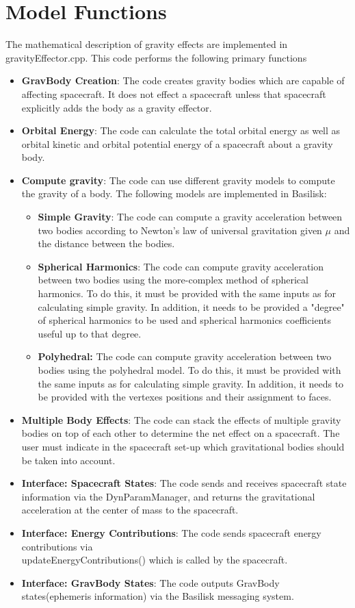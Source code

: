 \section{Model Functions}
The mathematical description of gravity effects are implemented in gravityEffector.cpp. This code performs the following primary functions
\begin{itemize}
	\item \textbf{GravBody Creation}: The code creates gravity bodies which are capable of affecting spacecraft. It does not effect a spacecraft unless that spacecraft explicitly adds the body as a gravity effector.
	\item \textbf{Orbital Energy}: The code can calculate the total orbital energy as well as orbital kinetic and orbital potential energy of a spacecraft about a gravity body.
	\item \textbf{Compute gravity}: The code can use different gravity models to compute the gravity of a body. The following models are implemented in Basilisk:
	\begin{itemize}
		\item \textbf{Simple Gravity}: The code can compute a gravity acceleration between two bodies according to Newton's law of universal gravitation given $\mu$ and the distance between the bodies.
		\item \textbf{Spherical Harmonics}: The code can compute gravity acceleration between two bodies using the more-complex method of spherical harmonics. To do this, it must be provided with the same inputs as for calculating simple gravity. In addition, it needs to be provided a "degree" of spherical harmonics to be used and spherical harmonics coefficients useful up to that degree.
		\item \textbf{Polyhedral:} The code can compute gravity acceleration between two bodies using the polyhedral model. To do this, it must be provided with the same inputs as for calculating simple gravity. In addition, it needs to be provided with the vertexes positions and their assignment to faces.
	\end{itemize}
	\item \textbf{Multiple Body Effects}: The code can stack the effects of multiple gravity bodies on top of each other to determine the net effect on a spacecraft. The user must indicate in the spacecraft set-up which gravitational bodies should be taken into account.
	\item \textbf{Interface: Spacecraft States}: The code sends and receives spacecraft state information via the DynParamManager, and returns the gravitational acceleration at the center of mass to the spacecraft.
	\item \textbf{Interface: Energy Contributions}: The code sends spacecraft energy contributions via \\updateEnergyContributions() which is called by the spacecraft.
	\item \textbf{Interface: GravBody States}: The code outputs GravBody states(ephemeris information) via the Basilisk messaging system.

\end{itemize}

